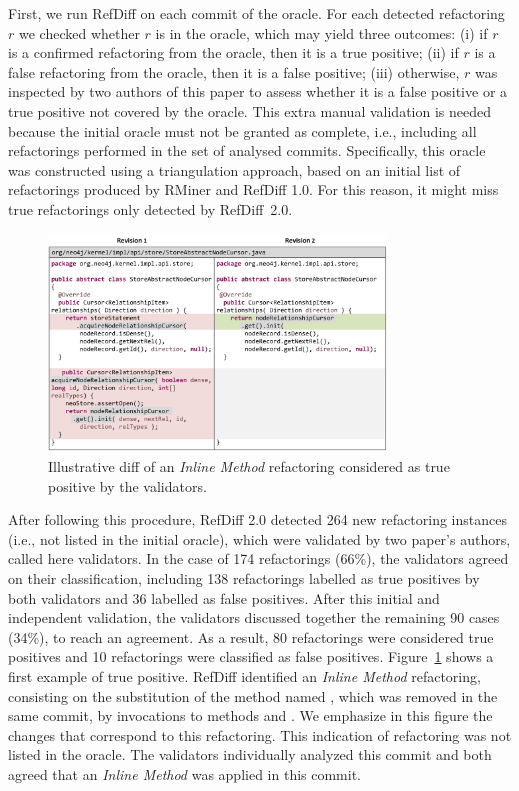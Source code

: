 First, we run RefDiff on each commit of the oracle. For each detected refactoring $r$ we checked whether $r$ is in the oracle, which may yield three outcomes: (i) if $r$ is a confirmed refactoring from the oracle, then it is a true positive; (ii) if $r$ is a false refactoring from the oracle, then it is a false positive; (iii) otherwise, $r$ was inspected by two authors of this paper to assess whether it is a false positive or a true positive not covered by the oracle.
This extra manual validation is needed because the initial oracle must not be granted as complete, i.e., including all refactorings performed in the set of analysed commits.
Specifically, this oracle was constructed using a triangulation approach, based on an initial list of refactorings produced by RMiner and RefDiff 1.0. For this reason, it might miss true refactorings only detected by RefDiff~2.0. %

\begin{figure}[!t]
\centering
\includegraphics[width=0.8\textwidth]{img/diff2.pdf}
\caption{Illustrative diff of an \emph{Inline Method} refactoring considered as true positive by the validators.}
\label{FigDiff2}
\end{figure}

After following this procedure, RefDiff 2.0 detected 264 new refactoring instances (i.e., not listed in the initial oracle), which were validated by two paper's authors, called here validators. In the case of 174 refactorings (66\%), the validators agreed on their classification, including 138 refactorings labelled as true positives by both validators and 36 labelled as false positives. After this initial and independent validation, the validators discussed together the remaining 90 cases (34\%), to reach an agreement. As a result, 80 refactorings were considered true positives and 10 refactorings were classified as false positives. Figure~\ref{FigDiff2} shows a first example of true positive. RefDiff identified an \emph{Inline Method} refactoring, consisting on the substitution of the method named , which was removed in the same commit, by invocations to methods  and . We emphasize in this figure the changes that correspond to this refactoring. This indication of refactoring was not listed in the oracle. The validators individually analyzed this commit and both agreed that an \emph{Inline Method} was applied in this commit.



